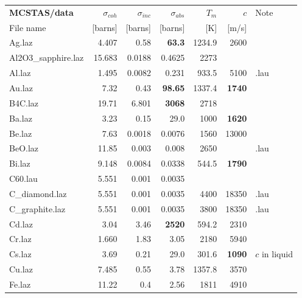 \begin{table}
  \begin{center}
    {\let\my=\\
    \begin{small}
    \begin{tabular}{|l|rrr|rr|p{}|}

      \hline
      \textbf{MCSTAS/data} & $\sigma_{coh}$&$\sigma_{inc}$&$\sigma_{abs}$&$T_m$       & $c$    & Note \\
          File name     & [barns]     & [barns]    & [barns]    & [K]        & [m/s] & \\
      \hline
Ag.laz             & 4.407     & 0.58     &\textbf{63.3}      &1234.9    &2600&\\
Al2O3\_sapphire.laz & 15.683    & 0.0188   &0.4625    &2273      &   &\\
Al.laz             & 1.495     & 0.0082   &0.231     &933.5     &5100& .lau\\
Au.laz             & 7.32      & 0.43     &\textbf{98.65}     &1337.4    &\textbf{1740}&\\
B4C.laz            & 19.71     & 6.801    &\textbf{3068}      &2718      &     &\\
Ba.laz             & 3.23      & 0.15     &29.0      &1000      &\textbf{1620}&\\
Be.laz             & 7.63      & 0.0018   &0.0076    &1560      &13000&\\
BeO.laz            & 11.85     & 0.003    &0.008     &2650      &   & .lau\\
Bi.laz             & 9.148     & 0.0084   &0.0338    &544.5     &\textbf{1790}&\\
C60.lau            & 5.551     & 0.001    &0.0035    &          &   &\\
C\_diamond.laz      & 5.551     & 0.001    &0.0035    &4400      &18350 & .lau\\
C\_graphite.laz     & 5.551     & 0.001    &0.0035    &3800      &18350 & .lau\\
Cd.laz             & 3.04      & 3.46     &\textbf{2520}      &594.2     &2310&\\
Cr.laz             & 1.660     & 1.83     &3.05      &2180      &5940&\\
Cs.laz             & 3.69      & 0.21     &29.0      &301.6     &\textbf{1090}  & $c$ in liquid\\
Cu.laz             & 7.485     & 0.55     &3.78      &1357.8    &3570&\\
Fe.laz             & 11.22     & 0.4      &2.56      &1811      &4910&\\

\end{tabular}
\end{small}}
\end{center}
\end{table}
